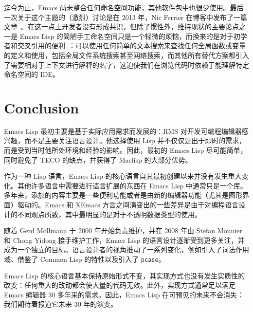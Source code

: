 \documentclass[format=acmsmall,screen]{acmart}
\newcommand \Elisp {Emacs Lisp}
\begin{document}
迄今为止，Emacs 尚未整合任何命名空间功能，其他软件包中也很少使用。最后一次关于这个主题的（激烈）讨论是在 2013 年，Nic Ferrier 在博客中发布了一篇文章~\cite{FerrierNamespaces}。在这一点上开发者没有形成共识，但除了惯性外，维持现状的主要论点之一是 Emacs Lisp 的简陋手工命名空间只是一个轻微的烦恼，而换来的是对于初学者和交叉引用的便利~\cite{namespace-discussion}：可以使用任何简单的文本搜索来查找任何全局函数或变量的定义和使用，包括全局文件系统搜索甚至网络搜索，而其他所有替代方案都引入了需要相对于上下文进行解释的名字，这迫使我们在浏览代码时依赖于能理解特定命名空间的 IDE。


\section{Conclusion}
\label{sec:conclusion}

Emacs Lisp 最初主要是基于实际应用需求而发展的：RMS 对开发可编程编辑器感兴趣，而不是主要关注语言设计。他选择使用 Lisp 并不仅仅是出于即时的需求，而是受到当时他所处环境和经验的影响。因此，最初的 Emacs Lisp 尽可能简单，同时避免了 TECO 的缺点，并获得了 Maclisp 的大部分优势。

作为一种 Lisp 语言，Emacs Lisp 的核心语言自其最初创建以来并没有发生重大变化。其他许多语言中需要进行语言扩展的东西在 Emacs Lisp 中通常只是一个库。多年来，添加的内容主要是一些便利功能或者是由新的编辑器功能（尤其是图形界面）驱动的。Emacs 和 XEmacs 方言之间演变出的一些差异是由于对编程语言设计的不同观点所致，其中最明显的是对于不透明数据类型的使用。

随着 Gerd Möllmann 于 2000 年开始负责维护，并在 2008 年由 Stefan Monnier 和 Chong Yidong 接手维护工作，Emacs Lisp 的语言设计逐渐受到更多关注，并成为一个独立的目标。语言设计者的视角推动了一系列变化，例如引入了词法作用域、借鉴了 Common Lisp 的特性以及引入了 \texttt{pcase}。

Emacs Lisp 的核心语言基本保持原始形式不变，其实现方式也没有发生实质性的改变：任何重大的改动都会使大量的代码无效。此外，实现方式通常足以满足 Emacs 编辑器 30 多年来的需求。因此，Emacs Lisp 在可预见的未来不会消失：我们期待着报道它未来 30 年的演变。

\end{document}
